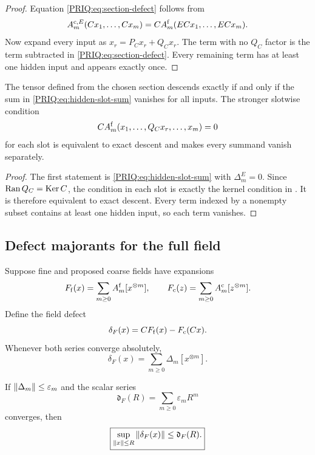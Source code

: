 \begin{proof}
Equation \eqref{PRIQ:eq:section-defect} follows from
\[
  A_m^{\mathrm c,E}(Cx_1,\ldots,Cx_m)
  =CA_m^{\mathrm f}(ECx_1,\ldots,ECx_m).
\]
Now expand every input as $x_r=P_Cx_r+Q_Cx_r$.  The term with no $Q_C$ factor is the term subtracted in \eqref{PRIQ:eq:section-defect}.  Every remaining term has at least one hidden input and appears exactly once.
\end{proof}

\begin{PRIQcorollary}\label{PRIQ:cor:hidden-interactions-exactness}
The tensor defined from the chosen section descends exactly if and only if the sum in \eqref{PRIQ:eq:hidden-slot-sum} vanishes for all inputs.  The stronger slotwise condition
\[
  CA_m^{\mathrm f}(x_1,\ldots,Q_Cx_r,\ldots,x_m)=0
\]
for each slot is equivalent to exact descent and makes every summand vanish separately.
\end{PRIQcorollary}

\begin{proof}
The first statement is \eqref{PRIQ:eq:hidden-slot-sum} with $\Delta_m^E=0$.  Since $\operatorname{Ran} Q_C=\operatorname{Ker} C$, the condition in each slot is exactly the kernel condition in .  It is therefore equivalent to exact descent.  Every term indexed by a nonempty subset contains at least one hidden input, so each term vanishes.
\end{proof}

\subsection{Defect majorants for the full field}
Suppose fine and proposed coarse fields have expansions
\[
  F_{\mathrm f}(x)=\sum_{m\geq0}A_m^{\mathrm f}[x^{\otimes m}],
  \qquad
  F_{\mathrm c}(z)=\sum_{m\geq0}A_m^{\mathrm c}[z^{\otimes m}].
\]
Define the field defect
\begin{equation}\label{PRIQ:eq:field-defect}
  \delta_F(x)
  =
  CF_{\mathrm f}(x)-F_{\mathrm c}(Cx).
\end{equation}
Whenever both series converge absolutely,
\begin{equation}\label{PRIQ:eq:field-defect-expansion}
  \delta_F(x)
  =
  \sum_{m\geq0}\Delta_m[x^{\otimes m}].
\end{equation}

\begin{PRIQproposition}\label{PRIQ:prop:defect-majorant}
If $\left\lVert \Delta_m\right\rVert\leq\varepsilon_m$ and the scalar series
\[
  \mathfrak d_F(R)=\sum_{m\geq0}\varepsilon_mR^m
\]
converges, then
\begin{equation}\label{PRIQ:eq:field-defect-majorant}
  \boxed{
  \sup_{\left\lVert x\right\rVert\leq R}\left\lVert \delta_F(x)\right\rVert
  \leq
  \mathfrak d_F(R).}
\end{equation}
\end{PRIQproposition}

